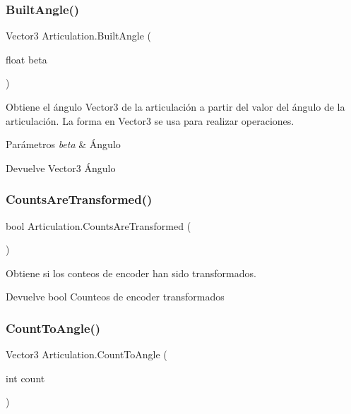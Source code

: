 \subsubsection{\texorpdfstring{BuiltAngle()}{BuiltAngle()}}
{\footnotesize\ttfamily Vector3 Articulation.\+Built\+Angle (\begin{DoxyParamCaption}\item[{float}]{beta }\end{DoxyParamCaption})\hspace{0.3cm}{\ttfamily [inline]}}

Obtiene el ángulo Vector3 de la articulación a partir del valor del ángulo de la articulación. La forma en Vector3 se usa para realizar operaciones. 
\begin{DoxyParams}{Parámetros}
{\em beta} & Ángulo \\
\hline
\end{DoxyParams}
\begin{DoxyReturn}{Devuelve}
Vector3 Ángulo 
\end{DoxyReturn}
\mbox{\label{class_articulation_aad8aba05576db394129968fe191ccc7c}} 
\subsubsection{\texorpdfstring{CountsAreTransformed()}{CountsAreTransformed()}}
{\footnotesize\ttfamily bool Articulation.\+Counts\+Are\+Transformed (\begin{DoxyParamCaption}{ }\end{DoxyParamCaption})\hspace{0.3cm}{\ttfamily [inline]}}

Obtiene si los conteos de encoder han sido transformados. \begin{DoxyReturn}{Devuelve}
bool Counteos de encoder transformados 
\end{DoxyReturn}
\mbox{\label{class_articulation_a8b735ad392d0329c76f91e95768c026d}} 
\subsubsection{\texorpdfstring{CountToAngle()}{CountToAngle()}}
{\footnotesize\ttfamily Vector3 Articulation.\+Count\+To\+Angle (\begin{DoxyParamCaption}\item[{int}]{count }\end{DoxyParamCaption})\hspace{0.3cm}{\ttfamily [inline]}}

